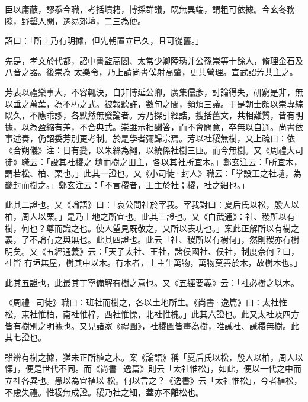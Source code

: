\begin{pinyinscope}
 臣以庸蔽，謬忝今職，考括墳籍，博採群議，既無異端，謂粗可依據。今玄冬務隙，野罄人閑，遷易郊壇，二三為便。



 詔曰：「所上乃有明據，但先朝置立已久，且可從舊。」



 先是，孝文於代都，詔中書監高閭、太常少卿陸琇并公孫崇等十餘人，脩理金石及八音之器。後崇為
 太樂令，乃上請尚書僕射高肇，更共營理。宣武詔芳共主之。



 芳表以禮樂事大，不容輒決，自非博延公卿，廣集儒彥，討論得失，研窮是非，無以垂之萬葉，為不朽之式。被報聽許，數旬之間，頻煩三議。于是朝士頗以崇專綜既久，不應乖謬，各默然無發論者。芳乃探引經誥，搜括舊文，共相難質，皆有明據，以為盈縮有差，不合典式。崇雖示相酬答，而不會問意，卒無以自通。尚書依事述奏，仍詔委芳別更考制。於是學者彌歸宗焉。芳以社稷無樹，又上疏曰：依《合朔儀》注：日有變，以朱絲為繩，以繞係社樹三匝。而今無樹。又《周禮大司徒》職云：「設其社稷之
 壝而樹之田主，各以其社所宜木。」鄭玄注云：「所宜木，謂若松、柏、栗也。」此其一證也。又《小司徒·封人》職云：「掌設王之社壝，為畿封而樹之。」鄭玄注云：「不言稷者，王主於社；稷，社之細也。」



 此其二證也。又《論語》曰：「哀公問社於宰我。宰我對曰：夏后氏以松，殷人以柏，周人以栗。」是乃土地之所宜也。此其三證也。又《白武通》：社、稷所以有樹，何也？尊而識之也。使人望見既敬之，又所以表功也。」案此正解所以有樹之義，了不論有之與無也。此其四證也。此云「社、稷所以有樹何」，然則稷亦有樹明矣。又《五經通義》云：「天子太社、王社，諸侯國社、侯社，制度奈何？曰，社皆
 有垣無屋，樹其中以木。有木者，土主生萬物，萬物莫善於木，故樹木也。」



 此其五證也，此最其丁寧備解有樹之意也。又《五經要義》云：「社必樹之以木。



 《周禮·司徒》職曰：班社而樹之，各以土地所生。《尚書·逸篇》曰：太社惟松，東社惟柏，南社惟梓，西社惟慄，北社惟槐。」此其六證也。此又太社及四方皆有樹別之明據也。又見諸家《禮圖》，社稷圖皆畫為樹，唯誡社、誡稷無樹。此其七證也。



 雖辨有樹之據，猶未正所植之木。案《論語》稱「夏后氏以松，殷人以柏，周人以慄」，便是世代不同。而《尚書·逸篇》則云「太社惟松」，如此，便以一代之中而立社各異也。愚以為宜植以
 松。何以言之？《逸書》云「太社惟松」，今者植松，不慮失禮。惟稷無成證。稷乃社之細，蓋亦不離松也。




\end{pinyinscope}
